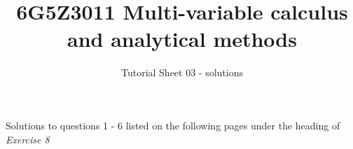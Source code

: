\documentclass[a4paper]{amsart}
\begin{document}
\title{6G5Z3011 Multi-variable calculus and analytical methods}
\author{Tutorial Sheet 03 - solutions}
\maketitle

Solutions to questions 1 - 6 listed on the following pages under the heading of \textit{Exercise 8}


\end{document}
